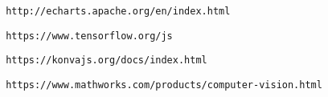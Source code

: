 \begin{thebibliography}{99}
 \begin{verbatim} http://echarts.apache.org/en/index.html 
\end{verbatim}

 \begin{verbatim} https://www.tensorflow.org/js 
\end{verbatim}

 \begin{verbatim} https://konvajs.org/docs/index.html
\end{verbatim}

 \begin{verbatim} https://www.mathworks.com/products/computer-vision.html
\end{verbatim}


\end{thebibliography}

